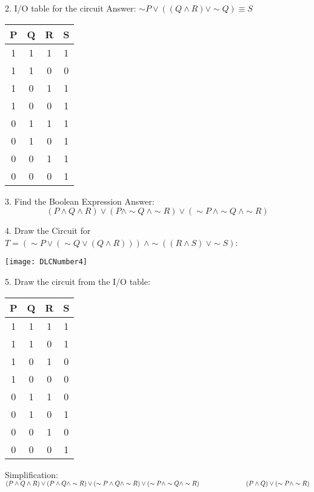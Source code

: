\documentclass[11pt]{article}
\newcommand\tab[1][1cm]{\hspace*{#1}}
\begin{document}
	\begin{flushleft}
	2. I/O table for the circuit
	Answer: $\sim P \lor ((Q \land R) \lor \sim Q) \equiv S$
	
	
    
	\begin{center}
	\begin{tabular}{|ccc|c|}\hline
	P&Q&R&S \\ \hline
	1&1&1&1 \\ 
	1&1&0&0 \\
	1&0&1&1 \\ 
	1&0&0&1 \\ 
	0&1&1&1 \\ 
	0&1&0&1 \\ 
	0&0&1&1 \\ 
	0&0&0&1 \\ \hline
	
	\end{tabular}
	\end{center}
	
	3. Find the Boolean Expression
	Answer: $$(P\land Q\land R) \lor (P\land \sim Q\ \land \sim R) \lor (\sim P\ \land \sim Q\ \land \sim R)$$
	
	4. Draw the Circuit for $T=(\sim P \lor (\sim Q \lor (Q \land R)))\ \land \sim ((R \land S)\  \lor \sim S)$:
	\begin{center}
	\texttt{[image: DLCNumber4]}
	\end{center}
	
	
	5. Draw the circuit from the I/O table:
	
	\begin{center}
	\begin{tabular}{|ccc|c|}\hline
	P&Q&R&S \\ \hline
	1&1&1&1 \\ 
	1&1&0&1 \\
	1&0&1&0 \\ 
	1&0&0&0 \\ 
	0&1&1&0 \\ 
	0&1&0&1 \\ 
	0&0&1&0 \\ 
	0&0&0&1 \\ \hline
	
	\end{tabular}
	\end{center}
	Simplification: 
	$(P\land Q\land R)\lor (P\land Q\land \sim R)\lor (\sim P\land Q\land \sim R)\lor (\sim P\land \sim Q\land \sim R) \newline \tab \tab \tab \hspace{-.42cm}(P \land Q)\lor (\sim P \land \sim R)$ 
	

\end{flushleft}
\end{document}
